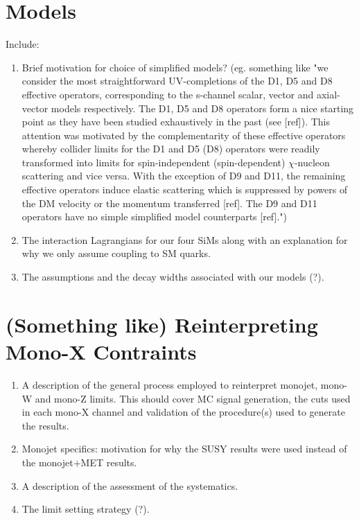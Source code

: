 \documentclass[a4paper,11pt]{article}
\begin{document}
\section{Models} 
\label{sec:sec2}
\begin{flushleft}
Include:
\begin{enumerate}
\item Brief motivation for choice of simplified models? (eg. something like "we consider the most straightforward UV-completions of the D1, D5 and D8 effective operators, corresponding to the s-channel scalar, vector and axial-vector models respectively. The D1, D5 and D8 operators form a nice starting point as they have been studied exhaustively in the past (see [ref]). This attention was motivated by the complementarity of these effective operators whereby collider limits
for the D1 and D5 (D8) operators were readily transformed into limits for spin-independent (spin-dependent) $\chi$-nucleon scattering and vice versa. With the exception of D9 and D11, the remaining effective operators induce elastic scattering which is suppressed by powers of the DM velocity or the momentum transferred [ref]. The D9 and D11 operators have no simple simplified model counterparts [ref].")
\item The interaction Lagrangians for our four SiMs along with an explanation for why we only assume coupling to SM quarks. 
\item The assumptions and the decay widths associated with our models (?).
\end{enumerate}
\end{flushleft}

\section{(Something like) Reinterpreting Mono-X Contraints} 
\label{sec:sec3}
\begin{flushleft}
\begin{enumerate}
\item A description of the general process employed to reinterpret monojet, mono-W and mono-Z limits. This should cover MC signal generation, the cuts used in each mono-X channel and validation of the procedure(s) used to generate the results.
\item Monojet specifics: motivation for why the SUSY results were used instead of the monojet+MET results.
\item A description of the assessment of the systematics.
\item The limit setting strategy (?).
\end{enumerate}
\end{flushleft}
\end{document}
